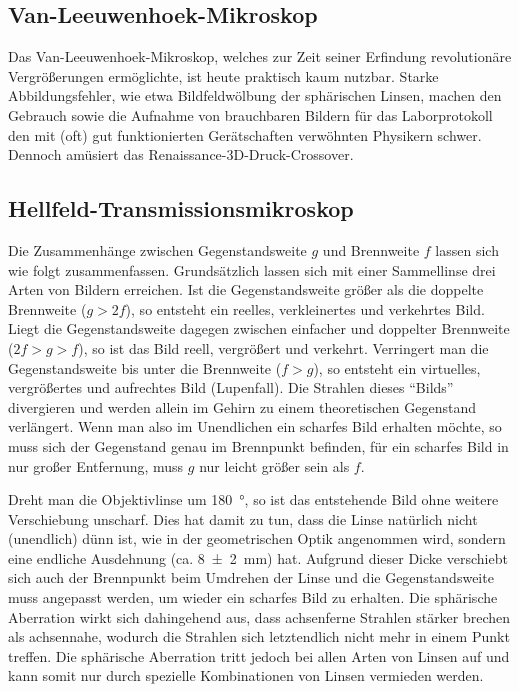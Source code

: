 \documentclass[english, ngerman]{scrartcl}
\begin{document}
\subsection{Van-Leeuwenhoek-Mikroskop}
\label{subsec:diskussion_Leeuwenhoek}

Das Van-Leeuwenhoek-Mikroskop, welches zur Zeit seiner Erfindung revolutionäre Vergrößerungen ermöglichte, ist heute praktisch kaum nutzbar. Starke Abbildungsfehler, wie etwa Bildfeldwölbung der sphärischen Linsen, machen den Gebrauch sowie die Aufnahme von brauchbaren Bildern für das Laborprotokoll den mit (oft) gut funktionierten Gerätschaften verwöhnten Physikern schwer. Dennoch amüsiert das Renaissance-3D-Druck-Crossover.


\subsection{Hellfeld-Transmissionsmikroskop}
\label{subsec:diskussion_hellfeld}

Die Zusammenhänge zwischen Gegenstandsweite $g$ und Brennweite $f$ lassen sich wie folgt zusammenfassen.
Grundsätzlich lassen sich mit einer Sammellinse drei Arten von Bildern erreichen. Ist die Gegenstandsweite größer als die doppelte Brennweite ($g>2f$), so entsteht ein reelles, verkleinertes und verkehrtes Bild. Liegt die Gegenstandsweite dagegen zwischen einfacher und doppelter Brennweite ($2f>g>f$), so ist das Bild reell, vergrößert und verkehrt. Verringert man die Gegenstandsweite bis unter die Brennweite ($f>g$), so entsteht ein virtuelles, vergrößertes und aufrechtes Bild (Lupenfall). Die Strahlen dieses \enquote{Bilds} divergieren und werden allein im Gehirn zu einem theoretischen Gegenstand verlängert. Wenn man also im Unendlichen ein scharfes Bild erhalten möchte, so muss sich der Gegenstand genau im Brennpunkt befinden, für ein scharfes Bild in nur großer Entfernung, muss $g$ nur leicht größer sein als $f$.

Dreht man die Objektivlinse um \SI{180}{\degree}, so ist das entstehende Bild ohne weitere Verschiebung unscharf. Dies hat damit zu tun, dass die Linse natürlich nicht (unendlich) dünn ist, wie in der geometrischen Optik angenommen wird, sondern eine endliche Ausdehnung (ca. \SI{8(2)}{mm}) hat. Aufgrund dieser Dicke verschiebt sich auch der Brennpunkt beim Umdrehen der Linse und die Gegenstandsweite muss angepasst werden, um wieder ein scharfes Bild zu erhalten. Die sphärische Aberration wirkt sich dahingehend aus, dass achsenferne Strahlen stärker brechen als achsennahe, wodurch die Strahlen sich letztendlich nicht mehr in einem Punkt treffen. Die sphärische Aberration tritt jedoch bei allen Arten von Linsen auf und kann somit nur durch spezielle Kombinationen von Linsen vermieden werden.
\end{document}
